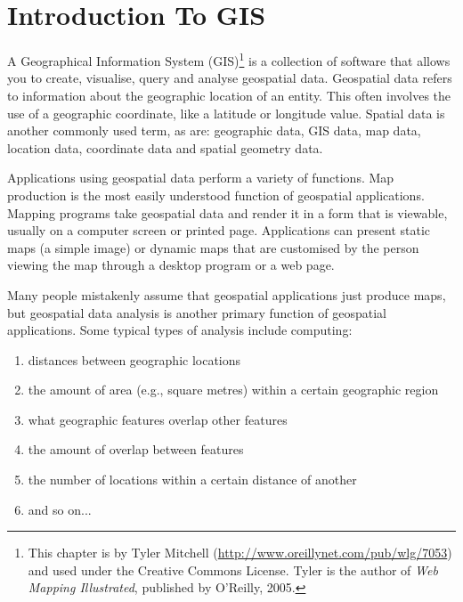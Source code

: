 
\section{Introduction To GIS}\label{label_intro}


A Geographical Information System (GIS)\cite{mitchel05}\footnote{This chapter is by Tyler
Mitchell (\url{http://www.oreillynet.com/pub/wlg/7053}) and
used under the Creative Commons License. Tyler is the author of 
\textit{Web Mapping Illustrated}, published by O'Reilly, 2005.}
is a collection of software that allows you to create, visualise, query and
analyse geospatial data. Geospatial data refers to information about the
geographic location of an entity. This often involves the use of a
geographic coordinate, like a latitude or longitude value. Spatial data is
another commonly used term, as are: geographic data, GIS data, map data,
location data, coordinate data and spatial geometry data.

Applications using geospatial data perform a variety of functions. Map
production is the most easily understood function of geospatial
applications. Mapping programs take geospatial data and render it in a form
that is viewable, usually on a computer screen or printed page.
Applications can present static maps (a simple image) or dynamic maps that
are customised by the person viewing the map through a desktop program or a
web page.

Many people mistakenly assume that geospatial applications just produce
maps, but geospatial data analysis is another primary function of
geospatial applications. Some typical types of analysis include computing:

\begin{enumerate}
\item distances between geographic locations
\item the amount of area (e.g., square metres) within a certain geographic
region
\item what geographic features overlap other features
\item the amount of overlap between features
\item the number of locations within a certain distance of another
\item and so on...
\end{enumerate}

